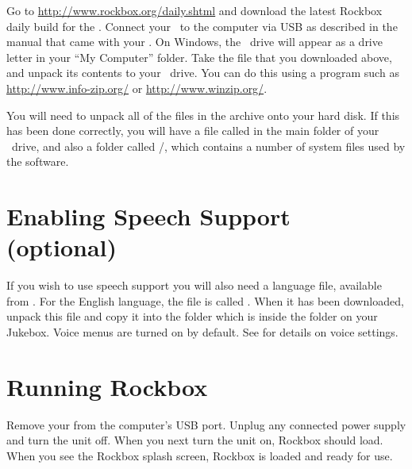 	Go to \url{http://www.rockbox.org/daily.shtml} and download the latest 
	Rockbox daily build for the \playertype{}.  Connect your \playerman\ to the 
	computer via USB as described in the manual that came with your \playerman{}. 
	On Windows, the	\playerman\ drive will appear as a drive letter in your 
	``My Computer''	folder. Take the file that you downloaded above, and unpack 
	its contents to	your \playerman\ drive. You can do this using a program 
	such as \url{http://www.info-zip.org/} or \url{http://www.winzip.org/}.


	You will need to unpack all of the files in the archive onto your hard disk. 
	If this has been done correctly, you will have a file called 
	\fname{\firmwarefilename} in the main folder of your \playerman\ drive, and 
	also a folder called /, which contains a number of system 
	files used by the software. 
	

\section{Enabling Speech Support (optional)}\label{sec:enabling_speech_support} 
If you wish to use speech support you will also need a language file, available 
from .  For the English language, the file is called 
. When it has been downloaded, unpack this file and copy it 
into the  folder which is inside the  folder on 
your Jukebox. Voice menus are turned on by default. See 
 for details on voice settings.

\section{Running Rockbox} 
Remove your \dap from the computer's USB port. Unplug any connected power supply 
and turn the unit off. When you next turn the unit on, Rockbox should load. When 
you see the Rockbox splash screen, Rockbox is loaded and ready for use.

